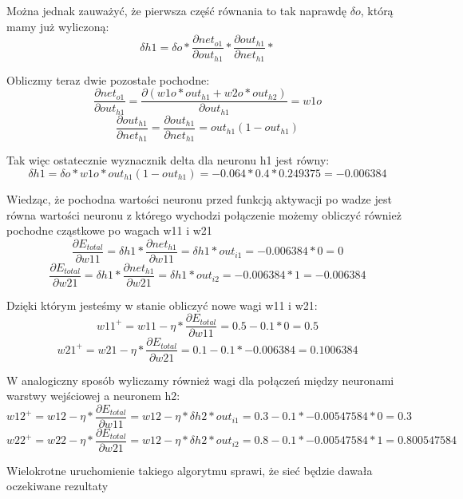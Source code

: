 Można jednak zauważyć, że pierwsza część równania to tak naprawdę \(\delta o\), którą mamy już wyliczoną:
\[
  \delta h1=
  \delta o *
  \frac{\partial net_{o1}}{\partial out_{h1}}*
  \frac{\partial out_{h1}}{\partial net_{h1}}*
\]

Obliczmy teraz dwie pozostałe pochodne:
\[
  \frac{\partial net_{o1}}{\partial out_{h1}} = \frac{\partial (w1o * out_{h1} + w2o * out_{h2})}{\partial out_{h1}}=w1o
\]
\[
  \frac{\partial out_{h1}}{\partial net_{h1}}= \frac{\partial out_{h1}}{\partial net_{h1}} = out_{h1}(1 - out_{h1})
\]

Tak więc ostatecznie wyznacznik delta dla neuronu h1 jest równy:
\[
  \delta h1= \delta o * w1o * out_{h1}(1 - out_{h1}) = -0.064 * 0.4 * 0.249375 = -0.006384
\]

Wiedząc, że pochodna wartości neuronu przed funkcją aktywacji po wadze jest równa wartości neuronu z którego wychodzi połączenie
możemy obliczyć również pochodne cząstkowe po wagach w11 i w21
\[
  \frac{\partial E_{total}}{\partial w11}=\delta h1 * \frac{\partial net_{h1}}{\partial w11}=\delta h1 * out_{i1}=-0.006384 * 0=0
\]
\[
  \frac{\partial E_{total}}{\partial w21}=\delta h1 * \frac{\partial net_{h1}}{\partial w21}=\delta h1 * out_{i2}=-0.006384 * 1=-0.006384
\]

Dzięki którym jesteśmy w stanie obliczyć nowe wagi w11 i w21:
\[
  w11^{+} = w11 - \eta * \frac{\partial E_{total}}{\partial w11}=0.5-0.1*0=0.5
\]
\[
  w21^{+} = w21 - \eta * \frac{\partial E_{total}}{\partial w21}=0.1-0.1*-0.006384=0.1006384
\]

W analogiczny sposób wyliczamy również wagi dla połączeń między neuronami warstwy wejściowej a neuronem h2:
\[
  w12^{+} = w12 - \eta * \frac{\partial E_{total}}{\partial w11}=w12 - \eta * \delta h2 * out_{i1}=0.3-0.1*-0.00547584*0=0.3
\]
\[
  w22^{+} = w22 - \eta * \frac{\partial E_{total}}{\partial w21}=w12 - \eta * \delta h2 * out_{i2}=0.8-0.1*-0.00547584*1=0.800547584
\]

Wielokrotne uruchomienie takiego algorytmu sprawi, że sieć będzie dawała oczekiwane rezultaty





